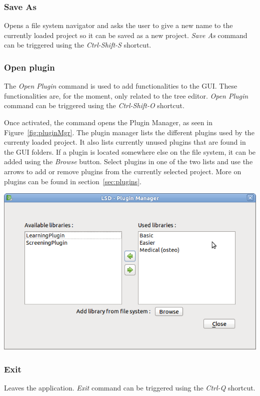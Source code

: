 \documentclass[a4paper,11pt]{report}
\begin{document}
\subsubsection{Save As}
Opens a file system navigator and asks the user to give a new name to the currently loaded project so it can be saved as a new project. \emph{Save As} command can be triggered using the \emph{Ctrl-Shift-S} shortcut.

\subsubsection{Open plugin}
\label{sec:pluginmgr}
The \emph{Open Plugin} command is used to add functionalities to the GUI. These functionalities are, for the moment, only related to the tree editor. \emph{Open Plugin} command can be triggered using the \emph{Ctrl-Shift-O} shortcut.

Once activated, the command opens the Plugin Manager, as seen in Figure~\ref{fig:pluginMgr}. The plugin manager lists the different plugins used by the currenty loaded project. It also lists currently unused plugins that are found in the GUI folders. If a plugin is located somewhere else on the file system, it can be added using the \emph{Browse} button. Select plugins in one of the two lists and use the arrows to add or remove plugins from the currently selected project. More on plugins can be found in section~\ref{sec:plugins}.

\begin{center}
\includegraphics[scale=0.3]{Pictures/Menu/PluginMgr.png}
\label{fig:pluginMgr}
\end{center}

\subsubsection{Exit}
Leaves the application. \emph{Exit} command can be triggered using the \emph{Ctrl-Q} shortcut.
\end{document}
